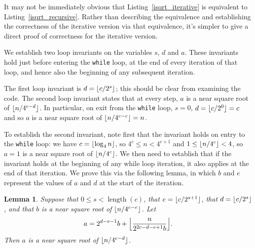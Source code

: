\documentclass[a4paper]{article}
\DeclarePairedDelimiter\floor{\lfloor}{\rfloor}
\DeclareMathOperator{\length}{length}
\theoremstyle{plain}
\newtheorem{lemma}[theorem]{Lemma}
\theoremstyle{definition}
\begin{document}


It may not be immediately obvious that Listing~\ref{isqrt_iterative} is
equivalent to Listing~\ref{isqrt_recursive}. Rather than describing the
equivalence and establishing the correctness of the iterative version via that
equivalence, it's simpler to give a direct proof of correctness for the
iterative version.

We establish two loop invariants on the variables $s$, $d$ and $a$. These
invariants hold just before entering the \lstinline$while$ loop, at the end
of every iteration of that loop, and hence also the beginning of any subsequent
iteration.

The first loop invariant is $d = \floor{c/2^s}$; this should be clear from
examining the code. The second loop invariant states that at every step, $a$ is
a near square root of $\floor{n / 4^{c-d}}$. In particular, on exit from the
\lstinline$while$ loop, $s = 0$, $d = \floor{c/2^0} = c$ and so $a$ is a near
square root of $\floor{n / 4^{c-c}} = n$.

To establish the second invariant, note first that the invariant holds on
entry to the \lstinline$while$ loop: we have $c = \floor{\log_4 n}$, so
$4^c \le n < 4^{c+1}$ and $1 \le \floor{n / 4^c} < 4$, so $a = 1$ is a near
square root of $\floor{n / 4^c}$. We then need to establish that if the
invariant holds at the beginning of any while loop iteration, it also applies
at the end of that iteration. We prove this via the following lemma, in which
$b$ and $e$ represent the values of $a$ and $d$ at the start of the iteration.

\begin{lemma}
  Suppose that $0 \le s < \length(c)$, that $e = \floor{c / 2^{s + 1}}$, that
  $d = \floor{c / 2^s}$, and that $b$ is a near square root of $\floor{n /
  4^{c-e}}$. Let
  $$a = 2^{d-e-1}b + \floor*{\frac{n}{2^{2c-d-e+1}b}}.$$ Then $a$ is a near
  square root of $\floor{n / 4^{c-d}}$.
\end{lemma}
\end{document}
